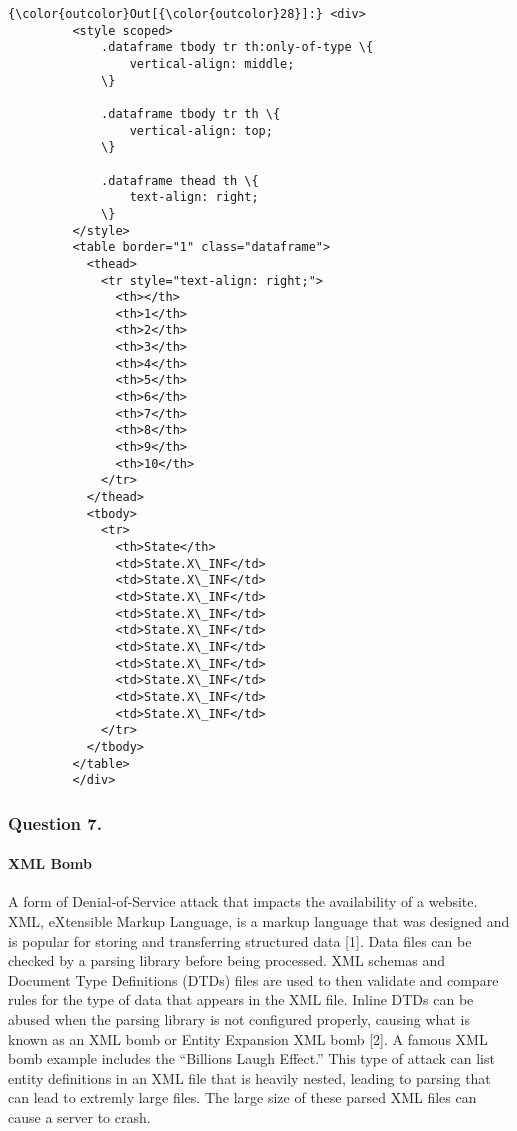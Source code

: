 \documentclass[11pt]{article}
\begin{document}
\begin{Verbatim}[commandchars=\\\{\}]
{\color{outcolor}Out[{\color{outcolor}28}]:} <div>
         <style scoped>
             .dataframe tbody tr th:only-of-type \{
                 vertical-align: middle;
             \}
         
             .dataframe tbody tr th \{
                 vertical-align: top;
             \}
         
             .dataframe thead th \{
                 text-align: right;
             \}
         </style>
         <table border="1" class="dataframe">
           <thead>
             <tr style="text-align: right;">
               <th></th>
               <th>1</th>
               <th>2</th>
               <th>3</th>
               <th>4</th>
               <th>5</th>
               <th>6</th>
               <th>7</th>
               <th>8</th>
               <th>9</th>
               <th>10</th>
             </tr>
           </thead>
           <tbody>
             <tr>
               <th>State</th>
               <td>State.X\_INF</td>
               <td>State.X\_INF</td>
               <td>State.X\_INF</td>
               <td>State.X\_INF</td>
               <td>State.X\_INF</td>
               <td>State.X\_INF</td>
               <td>State.X\_INF</td>
               <td>State.X\_INF</td>
               <td>State.X\_INF</td>
               <td>State.X\_INF</td>
             </tr>
           </tbody>
         </table>
         </div>
\end{Verbatim}
            
    \hypertarget{question-7.}{%
\subsubsection{Question 7.}\label{question-7.}}

    \hypertarget{xml-bomb}{%
\paragraph{XML Bomb}\label{xml-bomb}}

A form of Denial-of-Service attack that impacts the availability of a
website. XML, eXtensible Markup Language, is a markup language that was
designed and is popular for storing and transferring structured data
{[}1{]}. Data files can be checked by a parsing library before being
processed. XML schemas and Document Type Definitions (DTDs) files are
used to then validate and compare rules for the type of data that
appears in the XML file. Inline DTDs can be abused when the parsing
library is not configured properly, causing what is known as an XML bomb
or Entity Expansion XML bomb {[}2{]}. A famous XML bomb example includes
the ``Billions Laugh Effect.'' This type of attack can list entity
definitions in an XML file that is heavily nested, leading to parsing
that can lead to extremly large files. The large size of these parsed
XML files can cause a server to crash.
\end{document}
